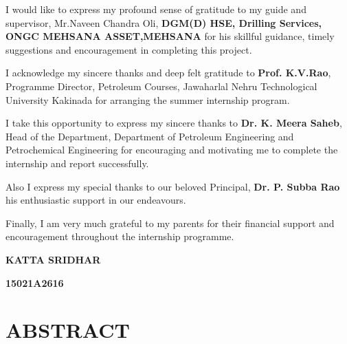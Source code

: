 \documentclass[11pt,a4paper]{report}
\begin{document}
\doublespacing


\vspace{1em}

I would like to express my profound sense of gratitude to my guide and supervisor, Mr.Naveen Chandra Oli, \textbf{DGM(D) HSE, Drilling Services, ONGC MEHSANA ASSET,MEHSANA} for his skillful guidance, timely suggestions and encouragement in completing this project.

\vspace{1em}


I acknowledge my sincere thanks and deep felt gratitude to \textbf{Prof. K.V.Rao}, Programme Director, Petroleum Courses, Jawaharlal Nehru Technological University Kakinada for arranging the summer internship program.

\vspace{1em}

I take this opportunity to express my sincere thanks to \textbf{Dr. K. Meera Saheb}, Head of the Department, Department of Petroleum Engineering and Petrochemical Engineering for encouraging and motivating me to complete the internship and report successfully.

\vspace{1em}

Also I express my special thanks to our beloved Principal, \textbf{Dr. P. Subba Rao} his enthusiastic support in our endeavours.

\vspace{1em}

Finally, I am very much grateful to my parents for their financial support and encouragement throughout the internship programme.

\vspace{1em}

\hfill \textbf{KATTA SRIDHAR}

\hfill \textbf{15021A2616} \hspace{0.005\textwidth}

\newpage

\tableofcontents


\newpage

\section*{\centering ABSTRACT}

\onehalfspacing
\end{document}
